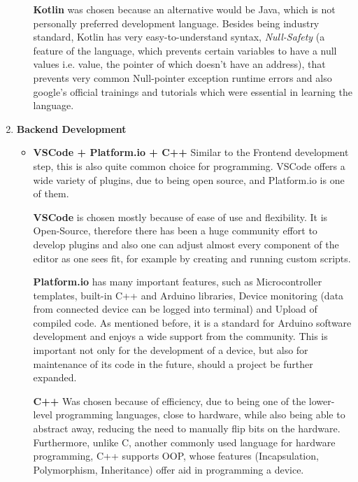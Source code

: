\begin{enumerate}
\begin{itemize}
		\textbf{Kotlin} was chosen because an alternative would be Java, which is not personally preferred development language. Besides being industry standard, Kotlin has very easy-to-understand syntax, \textit{Null-Safety} (a feature of the language, which prevents certain variables to have a null values i.e. value, the pointer of which doesn't have an address), that prevents very common Null-pointer exception runtime errors and also google's official trainings and tutorials which were essential in learning the language. 
	\end{itemize}
	\item\textbf{Backend Development}
	\begin{itemize}
		
		\item \textbf{VSCode + Platform.io + C++} Similar to the Frontend development step, this is also quite common choice for programming. \ac{VSCode} offers a wide variety of plugins, due to being open source, and Platform.io is one of them. 
		
		\textbf{VSCode} is chosen mostly because of ease of use and flexibility. It is Open-Source, therefore there has been a huge community effort to develop plugins and also one can adjust almost every component of the editor as one sees fit, for example by creating and running custom scripts.
		
		\textbf{Platform.io} has many important features, such as Microcontroller templates, built-in C++ and Arduino libraries, Device monitoring (data from connected device can be logged into terminal) and Upload of compiled code. As mentioned before, it is a standard for Arduino software development and enjoys a wide support from the community. This is important not only for the development of a device, but also for maintenance of its code in the future, should a project be further expanded.
		
		\textbf{C++} Was chosen because of efficiency, due to being one of the lower-level programming languages, close to hardware, while also being able to abstract away, reducing the need to manually flip bits on the hardware. Furthermore, unlike C, another commonly used language for hardware programming, C++ supports \ac{OOP}, whose features (Incapsulation, Polymorphism, Inheritance) offer aid in programming a device.
		
	\end{itemize}
	
\end{enumerate}